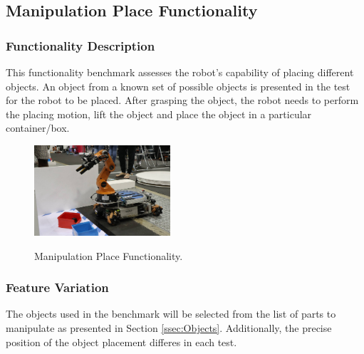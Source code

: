 

\subsection{Manipulation Place Functionality}
\label{ssec:ManipulationPlace}

\subsubsection{Functionality Description}
\label{sssec:ManipulationPlaceDescription}

This functionality benchmark assesses the robot's capability of placing different objects. 
An object from a known set of possible objects is presented in the test for the robot to be placed.
After grasping the object, the robot needs to perform the placing motion, lift the object and place the object in a particular container/box.


\begin{figure}[htb]
	\begin{center}
	\includegraphics[width=0.45\textwidth]{./fig/FBM/atwork/place_object.jpg}
			\label{fig:MarkerSetEndEffectorWithFrame}
	\caption{Manipulation Place Functionality.}
		\label{fig:ManipulationPlace} 
	\end{center}
\end{figure}
\subsubsection{Feature Variation}
\label{sssec:FBMManipulationPlaceVariation}

The objects used in the benchmark will be selected from the list of parts to manipulate as presented in Section \ref{ssec:Objects}.
Additionally, the precise position of the object placement differes in each test.
